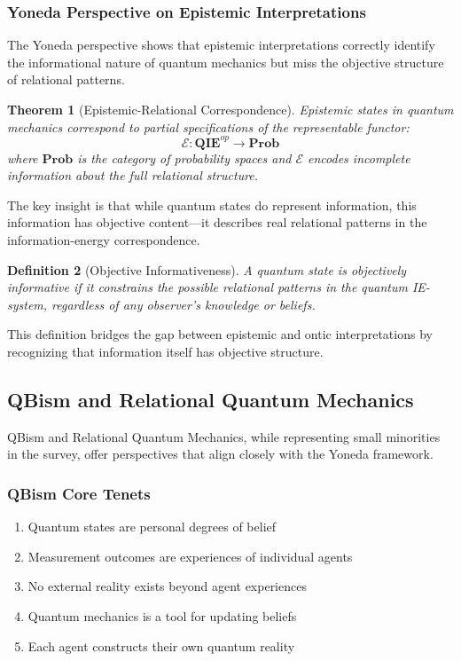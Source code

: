 \documentclass[12pt,a4paper]{article}
\newtheorem{theorem}{Theorem}[section]
\newtheorem{definition}[theorem]{Definition}
\begin{document}
\subsubsection{Yoneda Perspective on Epistemic Interpretations}

The Yoneda perspective shows that epistemic interpretations correctly identify the informational nature of quantum mechanics but miss the objective structure of relational patterns.

\begin{theorem}[Epistemic-Relational Correspondence]
Epistemic states in quantum mechanics correspond to partial specifications of the representable functor:
\[
\mathcal{E}: \mathbf{QIE}^{op} \to \mathbf{Prob}
\]
where $\mathbf{Prob}$ is the category of probability spaces and $\mathcal{E}$ encodes incomplete information about the full relational structure.
\end{theorem}

The key insight is that while quantum states do represent information, this information has objective content—it describes real relational patterns in the information-energy correspondence.

\begin{definition}[Objective Informativeness]
A quantum state is objectively informative if it constrains the possible relational patterns in the quantum IE-system, regardless of any observer's knowledge or beliefs.
\end{definition}

This definition bridges the gap between epistemic and ontic interpretations by recognizing that information itself has objective structure.

\subsection{QBism and Relational Quantum Mechanics}

QBism and Relational Quantum Mechanics, while representing small minorities in the survey, offer perspectives that align closely with the Yoneda framework.

\subsubsection{QBism Core Tenets}
\begin{enumerate}
\item Quantum states are personal degrees of belief
\item Measurement outcomes are experiences of individual agents
\item No external reality exists beyond agent experiences
\item Quantum mechanics is a tool for updating beliefs
\item Each agent constructs their own quantum reality
\end{enumerate}
\end{document}
